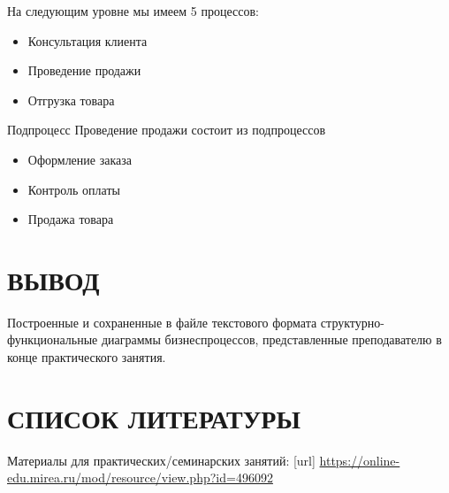 
\newpage

На следующим уровне мы имеем 5 процессов:
\begin{itemize}
	\item Консультация клиента
	\item Проведение продажи
	\item Отгрузка товара
\end{itemize}


\newpage

Подпроцесс Проведение продажи состоит из подпроцессов
\begin{itemize}
	\item Оформление заказа
	\item Контроль оплаты
	\item Продажа товара
\end{itemize}




\newpage

\section*{ВЫВОД}
Построенные и сохраненные в
файле текстового формата структурно-функциональные диаграммы бизнеспроцессов,
представленные преподавателю в конце практического занятия.

\section*{СПИСОК ЛИТЕРАТУРЫ}
\begin{thebibliography}{}
	\bibitem{}  Материалы для практических/семинарских занятий: [url]
	\url{https://online-edu.mirea.ru/mod/resource/view.php?id=496092}
\end{thebibliography}
